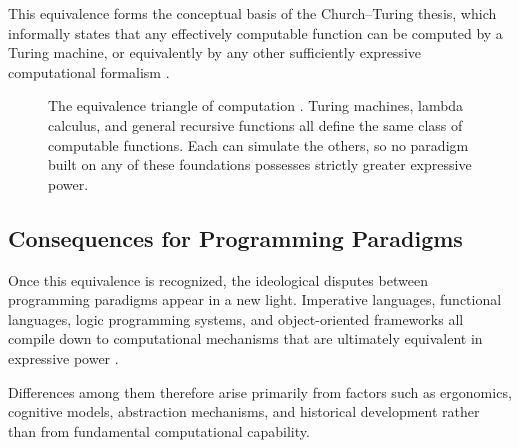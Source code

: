 \documentclass[12pt]{article}
\theoremstyle{definition}
\begin{document}
This equivalence forms the conceptual basis of the Church--Turing thesis,
which informally states that any effectively computable function can be
computed by a Turing machine, or equivalently by any other sufficiently
expressive computational formalism \cite{kleene1952}.

\begin{figure}[h]
\centering
{}
\caption{The equivalence triangle of computation \cite{kleene1952}.
Turing machines, lambda calculus, and general recursive functions all
define the same class of computable functions. Each can simulate the
others, so no paradigm built on any of these foundations possesses
strictly greater expressive power.}
\label{fig:equiv_triangle}
\end{figure}

\subsection{Consequences for Programming Paradigms}

Once this equivalence is recognized, the ideological disputes between
programming paradigms appear in a new light. Imperative languages,
functional languages, logic programming systems, and object-oriented
frameworks all compile down to computational mechanisms that are
ultimately equivalent in expressive power \cite{backus1978}.

Differences among them therefore arise primarily from factors such as
ergonomics, cognitive models, abstraction mechanisms, and historical
development rather than from fundamental computational capability.
\end{document}
